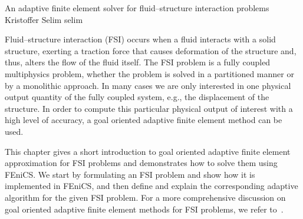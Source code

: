               {An adaptive finite element solver for fluid--structure interaction problems}
              {Kristoffer Selim}
              {selim}

\newcommand{\subdt}{\textrm{d}_t}
\newcommand{\divv}{\textrm{div}\;}
\newcommand{\Divv}{\textrm{Div}\;}
\newcommand{\uF}{u_{_{F}}}
\newcommand{\dotuF}{\dot{u}_{_{F}}}
\newcommand{\pF}{p_{_{F}}}
\newcommand{\rhoF}{\rho_{_{F}}}
\newcommand{\sigmaF}{\sigma_{_{F}}}
\newcommand{\sigmaFup}{\sigma_{_{F}}(u_{_{F}}, p_{_{F}})}
\newcommand{\sigmaS}{\sigma_{_{S}}}
\newcommand{\bff}{b_{_{F}}}
\newcommand{\graduF}{\textrm{grad}\;u_{_{F}}}
\newcommand{\US}{U_{_{S}}}
\newcommand{\uS}{u_{_{S}}}
\newcommand{\GradUS}{\textrm{Grad}\;U_{_{S}}}
\newcommand{\ddotUS}{\ddot{U}_{_{S}}}
\newcommand{\ddotuS}{\ddot{u}_{_{S}}}
\newcommand{\PS}{P_{_{S}}}
\newcommand{\rhoS}{\rho_{_{S}}}
\newcommand{\SigmaS}{\Sigma_{_{S}}}
\newcommand{\SigmaSU}{\Sigma_{_{S}}(U_{_{S}})}
\newcommand{\BS}{B_{_{S}}}
\newcommand{\M}{\mathcal{M}}
\newcommand{\E}{\mathcal{E}}
\newcommand{\oF}{\omega_{_{F}}}
\newcommand{\oS}{\omega_{_{S}}}
\newcommand{\OS}{\Omega_{_{S}}}
\newcommand{\OF}{\Omega_{_{F}}}
\newcommand{\PhiS}{\Phi_{_{S}}}
\newcommand{\PhiM}{\Phi_{_{M}}}
\newcommand{\FS}{F_{_{S}}}
\newcommand{\UM}{U_{_{M}}}
\newcommand{\SigmaM}{\Sigma_{_{M}}}
\newcommand{\GradUM}{\textrm{Grad}\;U_{_{M}}}
\newcommand{\UF}{U_{_{F}}}
\newcommand{\PF}{P_{_{F}}}
\newcommand{\AFF}{A_{_{FF}}}
\newcommand{\AFS}{A_{_{FS}}}
\newcommand{\AFM}{A_{_{FM}}}
\newcommand{\ASS}{A_{_{SS}}}
\newcommand{\ASF}{A_{_{SF}}}
\newcommand{\ASM}{A_{_{SM}}}
\newcommand{\AMM}{A_{_{MM}}}
\newcommand{\AMF}{A_{_{MF}}}
\newcommand{\AMS}{A_{_{MS}}}

Fluid--structure interaction (FSI) occurs when a fluid interacts with
a solid structure, exerting a traction force that causes deformation
of the structure and, thus, alters the flow of the fluid itself.  The
FSI problem is a fully coupled multiphysics problem, whether the
problem is solved in a partitioned manner or by a monolithic
approach. In many cases we are only interested in one
physical output quantity of the fully coupled system, e.g., the
displacement of the structure. In order to compute this particular
physical output of interest with a high level of accuracy, a goal
oriented adaptive finite element method can be used.

This chapter gives a short introduction to goal oriented adaptive
finite element approximation for FSI problems and demonstrates how to
solve them using FEniCS. We start by formulating an FSI problem and
show how it is implemented in FEniCS, and then define and explain the
corresponding adaptive algorithm for the given FSI problem. For a more
comprehensive discussion on goal oriented adaptive finite element
methods for FSI problems, we refer
to~\citet{SelimLogg2011a,Dunne2007,Dunne2006,
GratschBathe2006,BengzonLarson2010,ZeeBrummelenBorst2008a, Van2009}.
